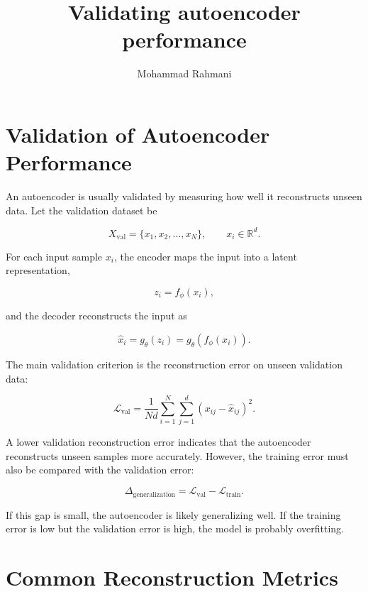 \documentclass[a4paper]{article}
\title{Validating autoencoder performance}
\date{}
\author{Mohammad Rahmani}
\begin{document}
    \maketitle
    
    
    \section{Validation of Autoencoder Performance}
        
        An autoencoder is usually validated by measuring how well it reconstructs unseen data.
        Let the validation dataset be
        
        \[
            X_{\mathrm{val}}=\{x_1,x_2,\dots,x_N\},
            \qquad
            x_i \in \mathbb{R}^{d}.
        \]
        
        For each input sample \(x_i\), the encoder maps the input into a latent representation,
        
        \[
            z_i=f_{\phi}(x_i),
        \]
        
        and the decoder reconstructs the input as
        
        \[
            \hat{x}_i=g_{\theta}(z_i)=g_{\theta}(f_{\phi}(x_i)).
        \]
        
        The main validation criterion is the reconstruction error on unseen validation data:
        
        \[
            \mathcal{L}_{\mathrm{val}}
            =
            \frac{1}{Nd}
            \sum_{i=1}^{N}
            \sum_{j=1}^{d}
            (x_{ij}-\hat{x}_{ij})^2.
        \]
        
        A lower validation reconstruction error indicates that the autoencoder reconstructs unseen samples more accurately.
        However, the training error must also be compared with the validation error:
        
        \[
            \Delta_{\mathrm{generalization}}
            =
            \mathcal{L}_{\mathrm{val}}
            -
            \mathcal{L}_{\mathrm{train}}.
        \]
        
        If this gap is small, the autoencoder is likely generalizing well.
        If the training error is low but the validation error is high, the model is probably overfitting.
    
    
    \section{Common Reconstruction Metrics}
        
\end{document}

